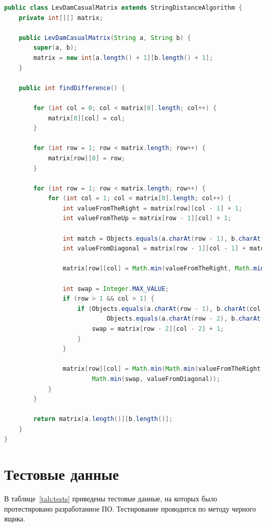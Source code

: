 \documentclass[12pt]{report}
\begin{document}
    \begin{lstlisting}[label=code:levDamCasual,caption=Метод для нахождения расстояния Дамерау-Левенштейна
    итерационно,language=java]
public class LevDamCasualMatrix extends StringDistanceAlgorithm {
    private int[][] matrix;

    public LevDamCasualMatrix(String a, String b) {
        super(a, b);
        matrix = new int[a.length() + 1][b.length() + 1];
    }

    public int findDifference() {

        for (int col = 0; col < matrix[0].length; col++) {
            matrix[0][col] = col;
        }

        for (int row = 1; row < matrix.length; row++) {
            matrix[row][0] = row;
        }

        for (int row = 1; row < matrix.length; row++) {
            for (int col = 1; col < matrix[0].length; col++) {
                int valueFromTheRight = matrix[row][col - 1] + 1;
                int valueFromTheUp = matrix[row - 1][col] + 1;

                int match = Objects.equals(a.charAt(row - 1), b.charAt(col - 1)) ? 0 : 1;
                int valueFromDiagonal = matrix[row - 1][col - 1] + match;

                matrix[row][col] = Math.min(valueFromTheRight, Math.min(valueFromTheUp, valueFromDiagonal));

                int swap = Integer.MAX_VALUE;
                if (row > 1 && col > 1) {
                    if (Objects.equals(a.charAt(row - 1), b.charAt(col - 2)) &&
                            Objects.equals(a.charAt(row - 2), b.charAt(col - 1))) {
                        swap = matrix[row - 2][col - 2] + 1;
                    }
                }

                matrix[row][col] = Math.min(Math.min(valueFromTheRight, valueFromTheUp),
                        Math.min(swap, valueFromDiagonal));
            }
        }

        return matrix[a.length()][b.length()];
    }
}
    \end{lstlisting}


    \section{Тестовые данные}
    В таблице~\ref{tab:tests} приведены тестовые данные, на которых было протестировано разработанное ПО.
    Тестирование проводится по методу черного ящика.
\end{document}
